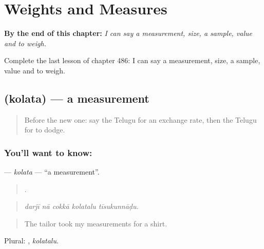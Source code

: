 
\chapter{Weights and Measures}
\label{ch:te-weights-and-measures}

\begin{chapteropening}
\textbf{By the end of this chapter:} \emph{I can say a measurement, size, a sample, value and to weigh.}

Complete the last lesson of chapter 486: I can say a measurement, size, a sample, value and to weigh.
\end{chapteropening}

\section[\texorpdfstring{\te{కొలత} (kolata)}{కొలత (kolata)}]{ (kolata) — a measurement}

\label{lesson:TE-C486-kolata}



\begin{quote}
Before the new one: say the Telugu for an exchange rate, then the Telugu for to dodge.
\end{quote}

\subsection*{You'll want to know: }
\textbf{} — \emph{kolata} — \textquotedblleft{}a measurement\textquotedblright{}.

\begin{quote}
    .
\end{quote}

\begin{quote}
\emph{darjī nā cokkā kolatalu tīsukunnāḍu.}
\end{quote}

\begin{quote}
The tailor took my measurements for a shirt.
\end{quote}

Plural: , \emph{kolatalu}.

